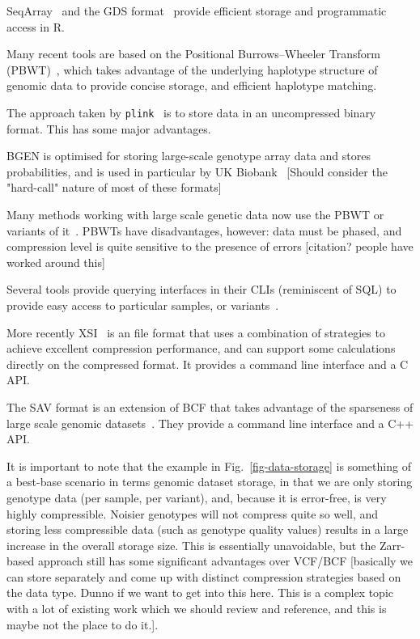 \documentclass[a4paper,num-refs]{oup-contemporary}
\newcommand{\toolname}[1]{\texttt{#1}}
\begin{document}
SeqArray~\citep{zheng2017seqarray} and the GDS format~\citep{zheng2012high}
provide efficient storage and programmatic access in R.


Many recent tools are based on the Positional Burrows--Wheeler
Transform (PBWT)~\citep{durbin2014efficient}, which takes advantage
of the underlying haplotype structure of genomic data to provide
concise storage, and efficient haplotype matching.

The approach taken by \toolname{plink}~\citep{purcell2007plink,chang2015second} is to
store data in an uncompressed binary format. This has some major
advantages.

BGEN \citep{band2018bgen} is optimised for storing large-scale
genotype array data and stores probabilities, and is used
in particular by UK Biobank~\citep{bycroft2018genome}
[Should consider the "hard-call" nature of most of these formats]

Many methods working with large scale genetic
data now use the PBWT or variants of
it~\citep[e.g.][]{li2016bgt,lefaive2021sparse,wertenbroek2022xsi}. PBWTs have
disadvantages, however: data must be phased, and compression level
is quite sensitive to the presence of errors [citation? people have
worked around this]

Several tools provide querying interfaces in their CLIs
(reminiscent of SQL) to provide easy access to particular samples, or
variants~\cite{li2016bgt,layer2016efficient}.

More recently XSI~\citep{wertenbroek2022xsi} is an file format that
uses a combination of strategies to achieve excellent compression
performance, and can support some calculations directly on the
compressed format. It provides a command line interface and a
C API.

The SAV format is an extension of BCF that takes advantage
of the sparseness of large scale genomic datasets~\citep{lefaive2021sparse}.
They provide a command line interface and a C++ API.

It is important to note that the example in Fig.~\ref{fig-data-storage}
is something of a best-base
scenario in terms genomic dataset storage, in that we are only
storing genotype data (per sample, per variant),
and, because it is error-free, is very
highly compressible. Noisier genotypes will not compress quite
so well, and storing less compressible data (such as genotype
quality values) results in a large increase in the overall
storage size. This is essentially unavoidable, but the Zarr-based
approach still has some significant advantages over VCF/BCF
[basically we can store separately and come up with distinct
compression strategies based on the data type. Dunno if we
want to get into this here. This is a complex topic with
a lot of existing work which we should review and reference,
and this is maybe not the place to do it.].
\end{document}
